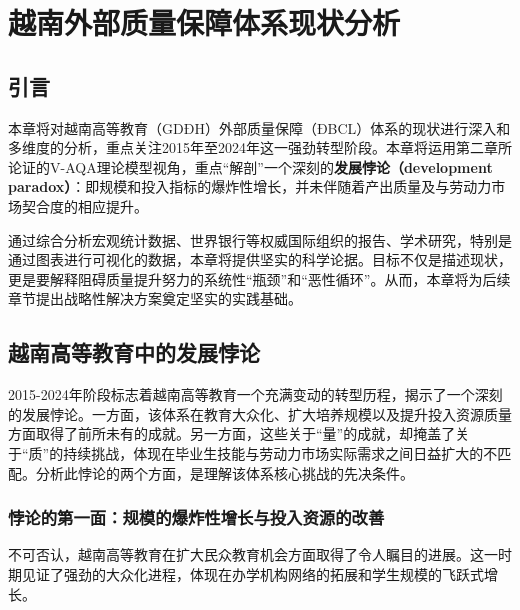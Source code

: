 

\chapter{越南外部质量保障体系现状分析}
\label{chap:thuc_trang}

\section*{引言}

本章将对越南高等教育（GDĐH）外部质量保障（ĐBCL）体系的现状进行深入和多维度的分析，重点关注2015年至2024年这一强劲转型阶段。本章将运用第二章所论证的V-AQA理论模型视角，重点“解剖”一个深刻的\textbf{发展悖论（development paradox）}：即规模和投入指标的爆炸性增长，并未伴随着产出质量及与劳动力市场契合度的相应提升。

通过综合分析宏观统计数据、世界银行等权威国际组织的报告、学术研究，特别是通过图表进行可视化的数据，本章将提供坚实的科学论据。目标不仅是描述现状，更是要解释阻碍质量提升努力的系统性“瓶颈”和“恶性循环”。从而，本章将为后续章节提出战略性解决方案奠定坚实的实践基础。

\section{越南高等教育中的发展悖论}
\label{sec:nghich_ly_phat_trien_vimo}

2015-2024年阶段标志着越南高等教育一个充满变动的转型历程，揭示了一个深刻的发展悖论。一方面，该体系在教育大众化、扩大培养规模以及提升投入资源质量方面取得了前所未有的成就。另一方面，这些关于“量”的成就，却掩盖了关于“质”的持续挑战，体现在毕业生技能与劳动力市场实际需求之间日益扩大的不匹配。分析此悖论的两个方面，是理解该体系核心挑战的先决条件。

\subsection{悖论的第一面：规模的爆炸性增长与投入资源的改善}
\label{subsec:ve_thu_nhat_nghich_ly}

不可否认，越南高等教育在扩大民众教育机会方面取得了令人瞩目的进展。这一时期见证了强劲的大众化进程，体现在办学机构网络的拓展和学生规模的飞跃式增长。

